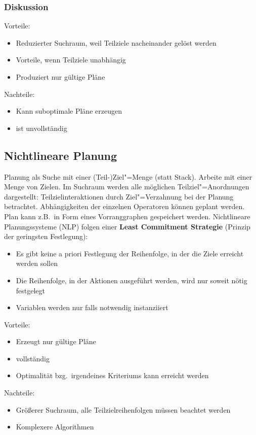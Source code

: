 \subsubsection{Diskussion}
Vorteile:
\begin{itemize}
	\item Reduzierter Suchraum, weil Teilziele nacheinander gelöst werden
	\item Vorteile, wenn Teilziele unabhängig
	\item Produziert nur gültige Pläne
\end{itemize}
Nachteile:
\begin{itemize}
	\item Kann suboptimale Pläne erzeugen
	\item ist unvollständig
\end{itemize}

\subsection{Nichtlineare Planung}
\label{ch06_nichtlinearePlanung}
Planung als Suche mit einer (Teil-)Ziel"=Menge (statt Stack). Arbeite mit einer Menge von Zielen.
Im Suchraum werden alle möglichen Teilziel"=Anordnungen dargestellt: Teilzielinteraktionen durch Ziel"=Verzahnung bei der Planung betrachtet.
Abhängigkeiten der einzelnen Operatoren können geplant werden.
Plan kann z.B.\ in Form eines Vorranggraphen gespeichert werden.
Nichtlineare Planungssysteme (NLP) folgen einer \textbf{Least Commitment Strategie} (Prinzip der geringsten Festlegung):
\begin{itemize}
	\item Es gibt keine a priori Festlegung der Reihenfolge, in der die Ziele erreicht werden sollen
	\item Die Reihenfolge, in der Aktionen ausgeführt werden, wird nur soweit nötig festgelegt
	\item Variablen werden nur falls notwendig instanziiert
\end{itemize}

Vorteile:
\begin{itemize}
	\item Erzeugt nur gültige Pläne
	\item vollständig
	\item Optimalität bzg.\ irgendeines Kriteriums kann erreicht werden
\end{itemize}
Nachteile:
\begin{itemize}
	\item Größerer Suchraum, alle Teilzielreihenfolgen müssen beachtet werden
	\item Komplexere Algorithmen
\end{itemize}

